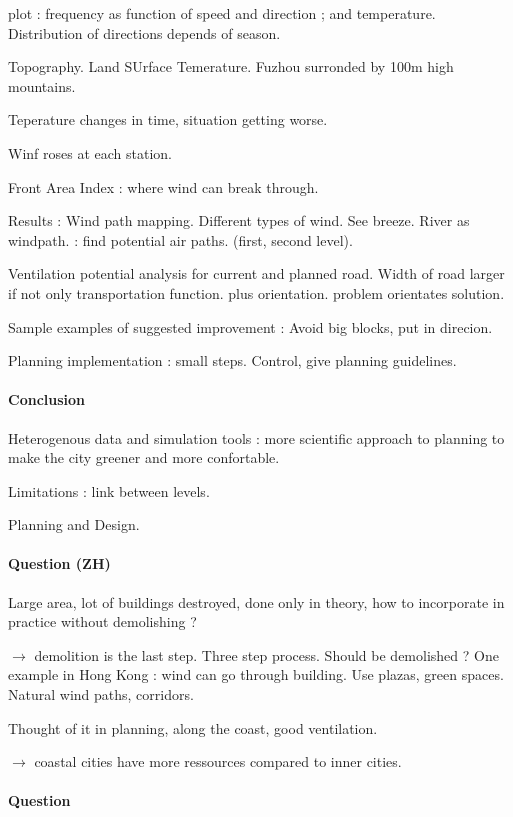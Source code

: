 \documentclass[11pt]{article}
\begin{document}
plot : frequency as function of speed and direction ; and temperature. Distribution of directions depends of season.

Topography. Land SUrface Temerature. Fuzhou surronded by 100m high mountains.

Teperature changes in time, situation getting worse.

Winf roses at each station.

Front Area Index : where wind can break through.

Results : Wind path mapping. Different types of wind. See breeze. River as windpath. : find potential air paths. (first, second level).

Ventilation potential analysis for current and planned road. Width of road larger if not only transportation function. plus orientation. problem orientates solution.

Sample examples of suggested improvement : Avoid big blocks, put in direcion.

Planning implementation : small steps. Control, give planning guidelines.

\paragraph{Conclusion}

Heterogenous data and simulation tools : more scientific approach to planning to make the city greener and more confortable.

Limitations : link between levels.

Planning and Design.

\paragraph{Question (ZH)}

Large area, lot of buildings destroyed, done only in theory, how to incorporate in practice without demolishing ?

$\rightarrow$ demolition is the last step. Three step process. Should be demolished ? One example in Hong Kong : wind can go through building. Use plazas, green spaces. Natural wind paths, corridors.

Thought of it in planning, along the coast, good ventilation.

$\rightarrow$ coastal cities have more ressources compared to inner cities.


\paragraph{Question}
\end{document}
